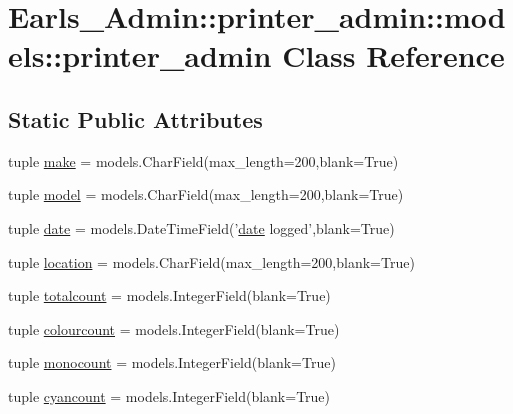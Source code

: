 \hypertarget{classEarls__Admin_1_1printer__admin_1_1models_1_1printer__admin}{
\section{Earls\_\-Admin::printer\_\-admin::models::printer\_\-admin Class Reference}
\label{classEarls__Admin_1_1printer__admin_1_1models_1_1printer__admin}
}
\subsection*{Static Public Attributes}
\begin{CompactItemize}
\item 
tuple \hyperlink{classEarls__Admin_1_1printer__admin_1_1models_1_1printer__admin_138a14c53aba41a662f01ee10665aee6}{make} = models.CharField(max\_\-length=200,blank=True)
\item 
tuple \hyperlink{classEarls__Admin_1_1printer__admin_1_1models_1_1printer__admin_6dec8ea6be11a2cefcd550d6f739163b}{model} = models.CharField(max\_\-length=200,blank=True)
\item 
tuple \hyperlink{classEarls__Admin_1_1printer__admin_1_1models_1_1printer__admin_d96a8c1b01806a9c78531fa676453f5b}{date} = models.DateTimeField('\hyperlink{classEarls__Admin_1_1printer__admin_1_1models_1_1printer__admin_d96a8c1b01806a9c78531fa676453f5b}{date} logged',blank=True)
\item 
tuple \hyperlink{classEarls__Admin_1_1printer__admin_1_1models_1_1printer__admin_141bb680a7441a5d68e032d467b1d742}{location} = models.CharField(max\_\-length=200,blank=True)
\item 
tuple \hyperlink{classEarls__Admin_1_1printer__admin_1_1models_1_1printer__admin_f60d770c368c6dae840ccdeca7c4db2a}{totalcount} = models.IntegerField(blank=True)
\item 
tuple \hyperlink{classEarls__Admin_1_1printer__admin_1_1models_1_1printer__admin_d6c2ad0df0522f351cce1fe942971353}{colourcount} = models.IntegerField(blank=True)
\item 
tuple \hyperlink{classEarls__Admin_1_1printer__admin_1_1models_1_1printer__admin_f479cde406f224d4536817b3ddecf9c1}{monocount} = models.IntegerField(blank=True)
\item 
tuple \hyperlink{classEarls__Admin_1_1printer__admin_1_1models_1_1printer__admin_24b1e2370cd39566887e2f5c6de5fc12}{cyancount} = models.IntegerField(blank=True)

\end{CompactItemize}
